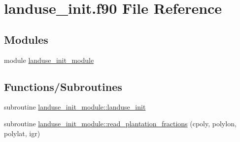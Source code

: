 \hypertarget{landuse__init_8f90}{}\section{landuse\+\_\+init.\+f90 File Reference}
\label{landuse__init_8f90}
\subsection*{Modules}
\begin{DoxyCompactItemize}
\item 
module \hyperlink{namespacelanduse__init__module}{landuse\+\_\+init\+\_\+module}
\end{DoxyCompactItemize}
\subsection*{Functions/\+Subroutines}
\begin{DoxyCompactItemize}
\item 
subroutine \hyperlink{namespacelanduse__init__module_a81acf257ffa26a7e5936b368657e717f}{landuse\+\_\+init\+\_\+module\+::landuse\+\_\+init}
\item 
subroutine \hyperlink{namespacelanduse__init__module_aa22d3c4f1ec0a27cd6e85e7fcd51234b}{landuse\+\_\+init\+\_\+module\+::read\+\_\+plantation\+\_\+fractions} (cpoly, polylon, polylat, igr)
\end{DoxyCompactItemize}
